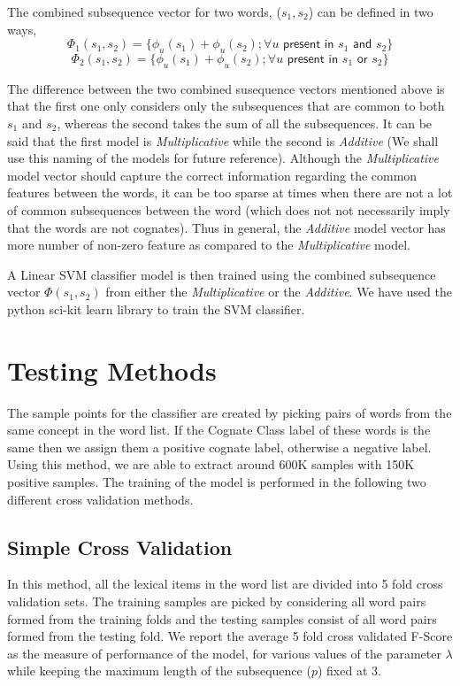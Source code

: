 The combined subsequence vector for two words, ($s_1, s_2$) can be defined in two ways,
\begin{equation}
\Phi_1(s_1, s_2) = \{\phi_u(s_1) + \phi_u(s_2); \forall u \textsf{ present in } s_1 \textsf{ and } s_2\}
\end{equation}
\begin{equation}
\Phi_2(s_1, s_2) = \{\phi_u(s_1) + \phi_u(s_2); \forall u \textsf{ present in } s_1 \textsf{ or } s_2\}
\end{equation}

The difference between the two combined susequence vectors mentioned above is that the first one only considers only the subsequences that are common to both $s_1$ and $s_2$, whereas the second takes the sum of all the subsequences. It can be said that the first model is \textit{Multiplicative} while the second is \textit{Additive} (We shall use this naming of the models for future reference). Although the \textit{Multiplicative} model vector should capture the correct information regarding the common features between the words, it can be too sparse at times when there are not a lot of common subsequences between the word (which does not not necessarily imply that the words are not cognates). Thus in general, the \textit{Additive} model vector has more number of non-zero feature as compared to the \textit{Multiplicative} model.

A Linear SVM classifier model is then trained using the combined subsequence vector $\Phi(s_1, s_2)$ from either the \textit{Multiplicative} or the \textit{Additive}. We have used the python sci-kit learn library to train the SVM classifier. 

\section{Testing Methods}
The sample points for the classifier are created by picking pairs of words from the same concept in the word list. If the Cognate Class label of these words is the same then we assign them a positive cognate label, otherwise a negative label. Using this method, we are able to extract around 600K samples with 150K positive samples. The training of the model is performed in the following two different cross validation methods.

\subsection{Simple Cross Validation}
In this method, all the lexical items in the word list are divided into 5 fold cross validation sets. The training samples are picked by considering all word pairs formed from the training folds and the testing samples consist of all word pairs formed from the testing fold. We report the average 5 fold cross validated F-Score as the measure of performance of the model, for various values of the parameter $\lambda$ while keeping the maximum length of the subsequence ($p$) fixed at 3.

